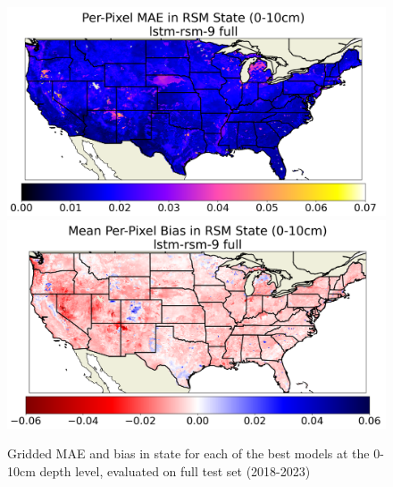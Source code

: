 \begin{figure}[hp!]
    \includegraphics[width=.48\linewidth,draft=false]{figures/grid-eval_best_full/eval-grid_full_lstm-rsm-9_rsm-10_spatial-stats_abs-err_state-err-abs-mean.png}
    \includegraphics[width=.48\linewidth,draft=false]{figures/grid-eval_best_full/eval-grid_full_lstm-rsm-9_rsm-10_spatial-stats_bias_state-err-bias-mean.png}

    \caption{Gridded MAE and bias in state for each of the best models at the 0-10cm depth level, evaluated on full test set (2018-2023)}
    \label{grid-full_rsm-10}
\end{figure}

